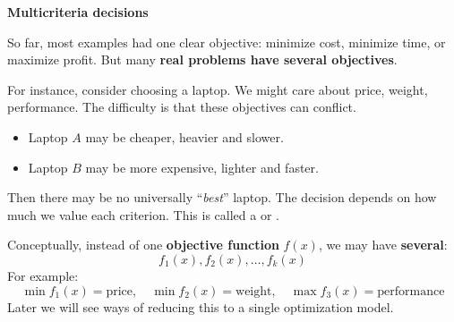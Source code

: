 \highspace
\begin{flushleft}
    \textcolor{Green3}{ \textbf{Multicriteria decisions}}
\end{flushleft}
So far, most examples had one clear objective: minimize cost, minimize time, or maximize profit. But many \textbf{real problems have several objectives}.

\highspace
For instance, consider choosing a laptop. We might care about price, weight, performance. The difficulty is that these objectives can conflict.
\begin{itemize}
    \item Laptop $A$ may be cheaper, heavier and slower.
    \item Laptop $B$ may be more expensive, lighter and faster.
\end{itemize}
Then there may be no universally ``\emph{best}'' laptop. The decision depends on how much we value each criterion. This is called a  or .

\highspace
Conceptually, instead of one \textbf{objective function} $f(x)$, we may have \textbf{several}:
\begin{equation*}
    f_1(x), f_2(x), \dots, f_k(x)
\end{equation*}
For example:
\begin{equation*}
    \min f_1(x) = \text{price}, \quad \min f_2(x) = \text{weight}, \quad \max f_3(x) = \text{performance}
\end{equation*}
Later we will see ways of reducing this to a single optimization model.

